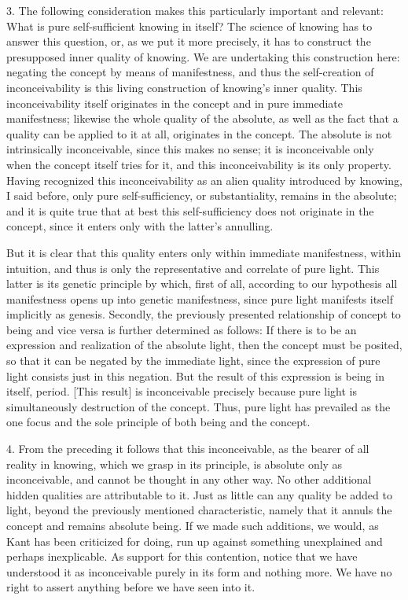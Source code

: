 3. The following consideration makes this
particularly important and relevant:
What is pure self-sufficient knowing in itself?
The science of knowing has to answer this question,
or, as we put it more precisely,
it has to construct the presupposed inner quality of knowing.
We are undertaking this construction here:
negating the concept by means of manifestness,
and thus the self-creation of inconceivability is
this living construction of knowing's inner quality.
This inconceivability itself originates in the concept and
in pure immediate manifestness;
likewise the whole quality of the absolute,
as well as the fact that a quality can be applied to it at all,
originates in the concept.
The absolute is not intrinsically inconceivable,
since this makes no sense;
it is inconceivable only when the concept itself tries for it,
and this inconceivability is its only property.
Having recognized this inconceivability as
an alien quality introduced by knowing, I said before,
only pure self-sufficiency, or substantiality, remains in the absolute;
and it is quite true that at best this
self-sufficiency does not originate in the concept,
since it enters only with the latter's annulling.

But it is clear that this quality enters only
within immediate manifestness, within intuition,
and thus is only the representative and correlate of pure light.
This latter is its genetic principle by which, first of all,
according to our hypothesis all manifestness opens up
into genetic manifestness, since pure light
manifests itself implicitly as genesis.
Secondly, the previously presented relationship of
concept to being and vice versa is further determined as follows:
If there is to be an expression and realization of the absolute light,
then the concept must be posited,
so that it can be negated by the immediate light,
since the expression of pure light consists just in this negation.
But the result of this expression is being in itself, period.
[This result] is inconceivable precisely because
pure light is simultaneously destruction of the concept.
Thus, pure light has prevailed as the one focus and
the sole principle of both being and the concept.

4. From the preceding it follows that this inconceivable,
as the bearer of all reality in knowing,
which we grasp in its principle,
is absolute only as inconceivable,
and cannot be thought in any other way.
No other additional hidden qualities are attributable to it.
Just as little can any quality be added to light,
beyond the previously mentioned characteristic,
namely that it annuls the concept and remains absolute being.
If we made such additions, we would,
as Kant has been criticized for doing,
run up against something unexplained and perhaps inexplicable.
As support for this contention,
notice that we have understood it as inconceivable
purely in its form and nothing more.
We have no right to assert anything before
we have seen into it.

